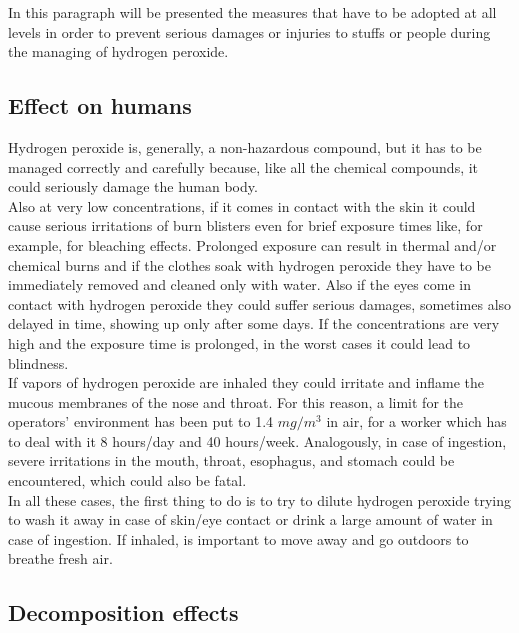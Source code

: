 \documentclass[a4paper]{report}
\begin{document}
In this paragraph will be presented the measures that have to be adopted at all levels in order to prevent serious damages or injuries to stuffs or people during the managing of hydrogen peroxide. 

\subsection{Effect on humans}

Hydrogen peroxide is, generally, a non-hazardous compound, but it has to be managed correctly and carefully because, like all the chemical compounds, it could seriously damage the human body. \\
Also at very low concentrations, if it comes in contact with the skin it could cause serious irritations of burn blisters even for brief exposure times like, for example, for bleaching effects. Prolonged exposure can result in thermal and/or chemical burns and if the clothes soak with hydrogen peroxide they have to be immediately removed and cleaned only with water. Also if the eyes come in contact with hydrogen peroxide they could suffer serious damages, sometimes also delayed in time, showing up only after some days. If the concentrations are very high and the exposure time is prolonged, in the worst cases it could lead to blindness. \\
If vapors of hydrogen peroxide are inhaled they could irritate and inflame the mucous membranes of the nose and throat. For this reason, a limit for the operators' environment has been put to 1.4 $mg/m^3$ in air, for a worker which has to deal with it 8 hours/day and 40 hours/week. Analogously, in case of ingestion, severe irritations in the mouth, throat, esophagus, and stomach could be encountered, which could also be fatal. \\
In all these cases, the first thing to do is to try to dilute hydrogen peroxide trying to wash it away in case of skin/eye contact or drink a large amount of water in case of ingestion. If inhaled, is important to move away and go outdoors to breathe fresh air.\\

\subsection{Decomposition effects}
\end{document}

